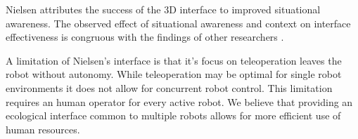 Nielsen attributes the success of the 3D interface to improved situational awareness. The observed effect of situational awareness and context on interface effectiveness is congruous with the findings of other researchers \cite{Nielsen_Teleoperation}.

A limitation of Nielsen's interface is that it's focus on teleoperation leaves the robot without autonomy. While teleoperation may be optimal for single robot environments it does not allow for concurrent robot control. This limitation requires an human operator for every active robot. We believe that providing an ecological interface common to multiple robots allows for more efficient use of human resources.

